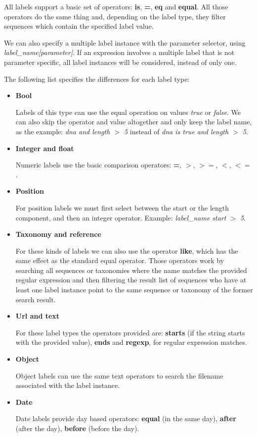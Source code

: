 All labels support a basic set of operators: \textbf{is}, \textbf{=}, \textbf{eq} and \textbf{equal}. All those operators do the same thing and, depending on the label type, they filter sequences which contain the specified label value.

We can also specify a multiple label instance with the parameter selector, using \textit{label\_name{[parameter]}}. If an expression involves a multiple label that is not parameter specific, all label instances will be considered, instead of only one.

The following list specifies the differences for each label type:

\begin{itemize}
  \item \textbf{Bool}
  
  Labels of this type can use the equal operation on values \textit{true} or \textit{false}. We can also skip the operator and value altogether and only keep the label name, as the example: \textit{dna and length $>$ 5} instead of \textit{dna is true and length $>$ 5}. 
  
  \item \textbf{Integer and float}
  
  Numeric labels use the basic comparison operators: \textbf{=}, \textbf{$>$}, \textbf{$>=$}, \textbf{$<$}, \textbf{$<=$}.

  \item \textbf{Position}
  
  For position labels we must first select between the start or the length component, and then an integer operator.
  Example: \textit{label\_name start $>$ 5}.
  
  \item \textbf{Taxonomy and reference}
  
  For these kinds of labels we can also use the operator \textbf{like}, which has the same effect as the standard equal operator. Those operators work by searching all sequences or taxonomies where the name matches the provided regular expression and then filtering the result list of sequences who have at least one label instance point to the same sequence or taxonomy of the former search result.
  
  \item \textbf{Url and text}
  
  For these label types the operators provided are: \textbf{starts} (if the string starts with the provided value),
  \textbf{ends} and \textbf{regexp}, for regular expression matches.
  
  \item \textbf{Object}
  
  Object labels can use the same text operators to search the filename associated with the label instance.
  
  \item \textbf{Date}
  
  Date labels provide day based operators: \textbf{equal} (in the same day), \textbf{after} (after the day),
  \textbf{before} (before the day).
\end{itemize}